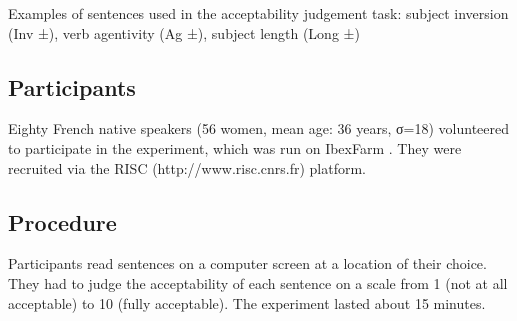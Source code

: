 \documentclass[output=paper]{langscibook}
\begin{document}
\begin{table}[H]

 \caption{Examples of sentences used in the acceptability judgement
   task:  subject inversion (Inv ±), verb agentivity (Ag ±), subject length (Long ±) 
 }
  \label{tab:4:annotation}

\end{table}


\subsection{Participants}
Eighty French native speakers (56 women, mean age: 36 years, σ=18) volunteered to participate in the experiment, which was run on IbexFarm \citep{drummond2013ibex}. They were recruited via the RISC (http://www.risc.cnrs.fr) platform. 

\subsection{Procedure}
Participants read sentences on a computer screen at a location of their choice. They had to judge the acceptability of each sentence on a scale from 1 (not at all acceptable) to 10 (fully acceptable). The experiment lasted about 15 minutes.
\end{document}
